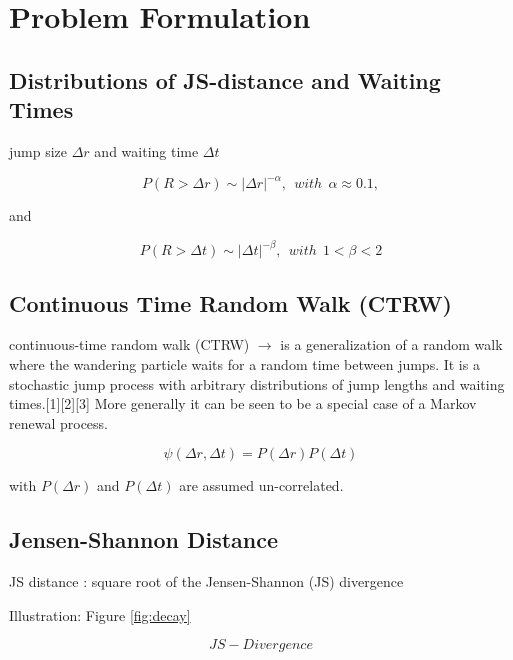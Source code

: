 \section{Problem Formulation}


\subsection{Distributions of JS-distance and Waiting Times}


jump size $\Delta r$ and waiting time $\Delta t$

\begin{equation}
P(R > \Delta r) \sim |\Delta r|^{-\alpha}, ~~with~~\alpha \approx 0.1,
\end{equation}

and

\begin{equation}
P(R > \Delta t) \sim |\Delta t|^{-\beta}, ~~ with~~  1< \beta < 2
\end{equation}

\subsection{Continuous Time Random Walk (CTRW)}

continuous-time random walk (CTRW)  $\rightarrow$ is a generalization of a random walk where the wandering particle waits for a random time between jumps. It is a stochastic jump process with arbitrary distributions of jump lengths and waiting times.[1][2][3] More generally it can be seen to be a special case of a Markov renewal process.

\begin{equation}
\psi(\Delta r,\Delta t)=P(\Delta r)P(\Delta t)
\end{equation}

with $P(\Delta r)$ and $P(\Delta t)$ are assumed un-correlated.





\subsection{Jensen-Shannon Distance}

JS distance : square root of the Jensen-Shannon (JS) divergence

Illustration: Figure \ref{fig:decay}

\begin{equation}
\label{JS-divergence}
JS-Divergence
\end{equation}

